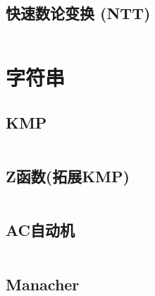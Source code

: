 \documentclass{article}
\begin{document}
\subsection{快速数论变换 (NTT)}
\inputminted[breaklines, frame=single]{c++}{../algo/数学/NTT.cpp}

\section{字符串}

\subsection{KMP}
\inputminted[breaklines, frame=single]{c++}{../algo/字符串/KMP.cpp}

\subsection{Z函数(拓展KMP)}
\inputminted[breaklines, frame=single]{c++}{../algo/字符串/Z函数.cpp}


\subsection{AC自动机}
\inputminted[breaklines, frame=single]{c++}{../algo/字符串/AC自动机.cpp}


\subsection{Manacher}
\inputminted[breaklines, frame=single]{c++}{../algo/字符串/manacher.cpp}
\end{document}
